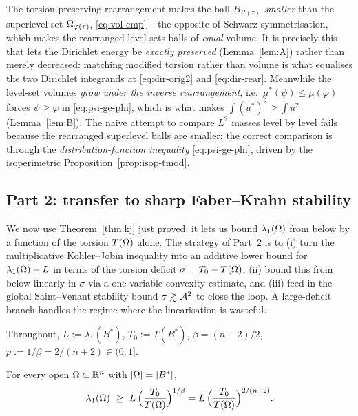 \begin{remark}
\label{rem:sign}
The torsion-preserving rearrangement makes the ball
$B_{R(\tau)}$ \emph{smaller} than the superlevel set
$\Omega_{\varphi(\tau)}$, \eqref{eq:vol-cmp} -- the opposite of Schwarz
symmetrisation, which makes the rearranged level sets balls of \emph{equal}
volume. It is precisely this that lets the Dirichlet energy be
\emph{exactly preserved} (Lemma~\ref{lem:A}) rather than merely decreased:
matching modified torsion rather than volume is what equalises the two
Dirichlet integrands at \eqref{eq:dir-orig2} and \eqref{eq:dir-rear}.
Meanwhile the level-set volumes \emph{grow under the inverse rearrangement},
i.e.\ $\mu^*(\psi)\le\mu(\varphi)$ forces $\psi\ge\varphi$ in
\eqref{eq:psi-ge-phi}, which is what makes $\int(u^*)^2\ge\int u^2$
(Lemma~\ref{lem:B}). The naive attempt to compare $L^2$ masses level by
level fails because the rearranged superlevel balls are smaller; the correct
comparison is through the \emph{distribution-function inequality}
\eqref{eq:psi-ge-phi}, driven by the isoperimetric
Proposition~\ref{prop:isop-tmod}.
\end{remark}

\subsection{Part 2: transfer to sharp Faber--Krahn stability}
\label{ssec:transfer}

We now use Theorem~\ref{thm:kj} just proved: it lets us bound
$\lambda_1(\Omega)$ from below by a function of the torsion $T(\Omega)$ alone. The
strategy of Part~2 is to (i) turn the multiplicative Kohler--Jobin
inequality into an additive lower bound for $\lambda_1(\Omega)-L$ in terms of
the torsion deficit $\sigma=T_0-T(\Omega)$, (ii) bound this from below linearly
in $\sigma$ via a one-variable convexity estimate, and (iii) feed in the
global Saint--Venant stability bound $\sigma\gtrsim\mathcal A^2$ to close the loop.
A large-deficit branch handles the regime where the linearisation is wasteful.

Throughout, $L:=\lambda_1(B^*)$, $T_0:=T(B^*)$, $\beta=(n+2)/2$,
$p:=1/\beta=2/(n+2)\in(0,1]$.

\begin{lemma}\label{lem:ptwise}
For every open $\Omega\subset\mathbb R^n$ with $\left|\Omega\right|=\left|B^*\right|$,
\begin{equation}\label{eq:ptwise}
  \lambda_1(\Omega)\ \ge\ L\,\Bigl(\frac{T_0}{T(\Omega)}\Bigr)^{1/\beta}
  =L\,\Bigl(\frac{T_0}{T(\Omega)}\Bigr)^{2/(n+2)} .
\end{equation}
\end{lemma}

